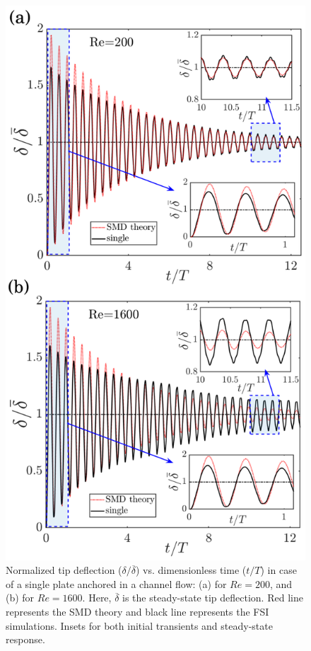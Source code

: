 \documentclass[aps,pre,twocolumn,aps,longbibliography]{revtex4-1}
\begin{document}
	\begin{figure}[b]
		\begin{minipage}[c]{0.8\linewidth}
			\includegraphics[width=1\linewidth]{Fig04.pdf} 
		\end{minipage} 
		\caption{Normalized tip deflection ($\delta/\overline{\delta}$) vs. dimensionless time ($t/T$) in case of a single plate anchored in a channel flow: (a) for $Re=200$, and (b) for $Re=1600$. Here, $\overline{\delta}$ is the steady-state tip deflection. Red line represents the SMD theory and black line represents the FSI simulations. Insets for both initial transients and steady-state response.}
		\label{damping_singlefil}
	\end{figure}
	
\end{document}
